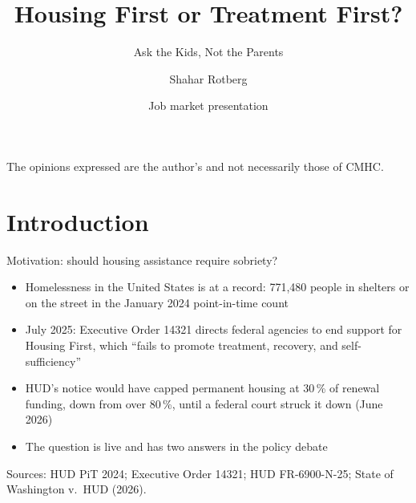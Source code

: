 \documentclass[aspectratio=169,11pt]{beamer}
\title{Housing First or Treatment First?}
\subtitle{Ask the Kids, Not the Parents}
\author{Shahar Rotberg}
\institute{Canada Mortgage and Housing Corporation}
\date{Job market presentation}
\newcommand{\HF}{Housing First}
\newcommand{\pc}{\,\%}
\newcommand{\source}[1]{\par\vfill{\color{lgrey}\tiny #1}}
\begin{document}
{
\begin{frame}
\titlepage
\vfill
{\centering\color{lgrey}\tiny The opinions expressed are the author's and not necessarily those of CMHC.\par}
\end{frame}}

\section{Introduction}

\begin{frame}{Motivation: should housing assistance require sobriety?}
\begin{itemize}\setlength\itemsep{0.6em}
\item Homelessness in the United States is at a record: 771,480 people in shelters or on the street in the January 2024 point-in-time count
\item July 2025: Executive Order 14321 directs federal agencies to end support for \HF{}, which ``fails to promote treatment, recovery, and self-sufficiency''
\item HUD's notice would have capped permanent housing at 30\pc{} of renewal funding, down from over 80\pc, until a federal court struck it down (June 2026)
\item The question is live and has two answers in the policy debate
\end{itemize}
\source{Sources: HUD PiT 2024; Executive Order 14321; HUD FR-6900-N-25; State of Washington v.\ HUD (2026).}
\end{frame}
\end{document}
